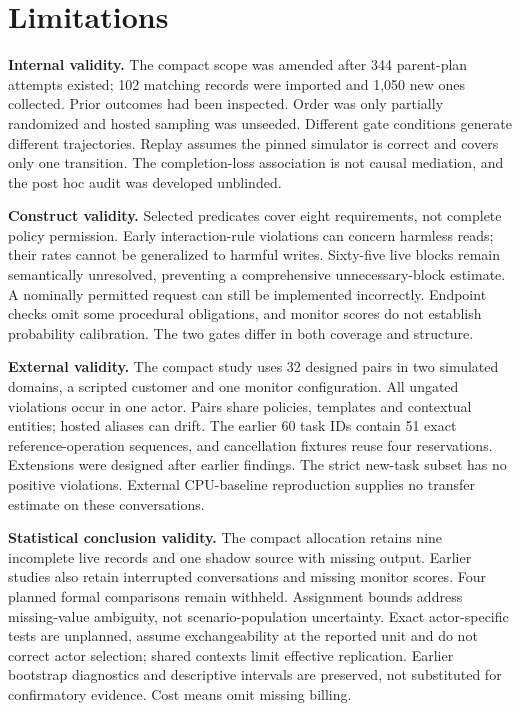 \section{Limitations}\label{limitations}

\textbf{Internal validity.} The compact scope was amended after 344
parent-plan attempts existed; 102 matching records were imported and
1,050 new ones collected. Prior outcomes had been inspected. Order was
only partially randomized and hosted sampling was unseeded. Different
gate conditions generate different trajectories. Replay assumes the
pinned simulator is correct and covers only one transition. The
completion-loss association is not causal mediation, and the post hoc
audit was developed unblinded.

\textbf{Construct validity.} Selected predicates cover eight
requirements, not complete policy permission. Early interaction-rule
violations can concern harmless reads; their rates cannot be generalized
to harmful writes. Sixty-five live blocks remain semantically
unresolved, preventing a comprehensive unnecessary-block estimate. A
nominally permitted request can still be implemented incorrectly.
Endpoint checks omit some procedural obligations, and monitor scores do
not establish probability calibration. The two gates differ in both
coverage and structure.

\textbf{External validity.} The compact study uses 32 designed pairs in
two simulated domains, a scripted customer and one monitor
configuration. All ungated violations occur in one actor. Pairs share
policies, templates and contextual entities; hosted aliases can drift.
The earlier 60 task IDs contain 51 exact reference-operation sequences,
and cancellation fixtures reuse four reservations. Extensions were
designed after earlier findings. The strict new-task subset has no
positive violations. External CPU-baseline reproduction supplies no
transfer estimate on these conversations.

\textbf{Statistical conclusion validity.} The compact allocation retains
nine incomplete live records and one shadow source with missing output.
Earlier studies also retain interrupted conversations and missing
monitor scores. Four planned formal comparisons remain withheld.
Assignment bounds address missing-value ambiguity, not
scenario-population uncertainty. Exact actor-specific tests are
unplanned, assume exchangeability at the reported unit and do not
correct actor selection; shared contexts limit effective replication.
Earlier bootstrap diagnostics and descriptive intervals are preserved,
not substituted for confirmatory evidence. Cost means omit missing
billing.

